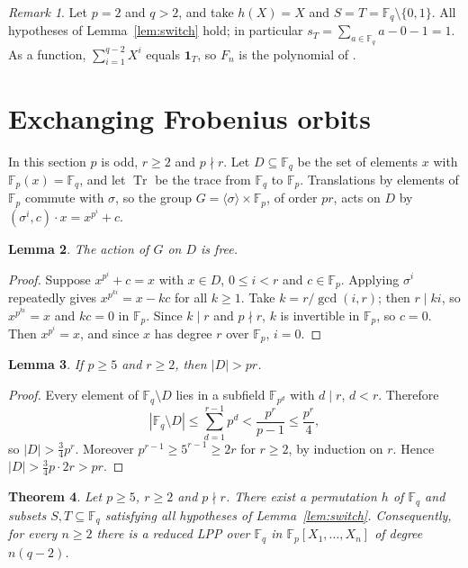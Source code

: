 \documentclass[11pt]{amsart}
\newtheorem{theorem}{Theorem}[section]
\newtheorem{lemma}[theorem]{Lemma}
\theoremstyle{definition}
\theoremstyle{remark}
\newtheorem{remark}[theorem]{Remark}
\newcommand{\F}{\mathbb{F}}
\newcommand{\Tr}{\operatorname{Tr}}
\newcommand{\one}{\mathbf{1}}
\begin{document}
\begin{remark}\label{rem:char2}
Let $p=2$ and $q>2$, and take $h(X)=X$ and $S=T=\F_q\setminus\{0,1\}$. All hypotheses of Lemma~\ref{lem:switch} hold; in particular $s_T=\sum_{a\in\F_q}a-0-1=1$. As a function, $\sum_{i=1}^{q-2}X^i$ equals $\one_T$, so $F_n$ is the polynomial of \cite[Theorem~4]{GU25a}.
\end{remark}

\section{Exchanging Frobenius orbits}\label{sec:exchange}

In this section $p$ is odd, $r\ge2$ and $p\nmid r$. Let $D\subseteq\F_q$ be the set of elements $x$ with $\F_p(x)=\F_q$, and let $\Tr$ be the trace from $\F_q$ to $\F_p$. Translations by elements of $\F_p$ commute with $\sigma$, so the group $G=\langle\sigma\rangle\times\F_p$, of order $pr$, acts on $D$ by $(\sigma^i,c)\cdot x=x^{p^i}+c$.

\begin{lemma}\label{lem:free}
The action of $G$ on $D$ is free.
\end{lemma}

\begin{proof}
Suppose $x^{p^i}+c=x$ with $x\in D$, $0\le i<r$ and $c\in\F_p$. Applying $\sigma^i$ repeatedly gives $x^{p^{ki}}=x-kc$ for all $k\ge1$. Take $k=r/\gcd(i,r)$; then $r\mid ki$, so $x^{p^{ki}}=x$ and $kc=0$ in $\F_p$. Since $k\mid r$ and $p\nmid r$, $k$ is invertible in $\F_p$, so $c=0$. Then $x^{p^i}=x$, and since $x$ has degree $r$ over $\F_p$, $i=0$.
\end{proof}

\begin{lemma}\label{lem:count}
If $p\ge5$ and $r\ge2$, then $|D|>pr$.
\end{lemma}

\begin{proof}
Every element of $\F_q\setminus D$ lies in a subfield $\F_{p^d}$ with $d\mid r$, $d<r$. Therefore
\[
|\F_q\setminus D|\le\sum_{d=1}^{r-1}p^d<\frac{p^r}{p-1}\le\frac{p^r}{4},
\]
so $|D|>\tfrac34p^r$. Moreover $p^{r-1}\ge5^{r-1}\ge2r$ for $r\ge2$, by induction on $r$. Hence $|D|>\tfrac34p\cdot2r>pr$.
\end{proof}

\begin{theorem}\label{thm:exchange}
Let $p\ge5$, $r\ge2$ and $p\nmid r$. There exist a permutation $h$ of $\F_q$ and subsets $S,T\subseteq\F_q$ satisfying all hypotheses of Lemma~\ref{lem:switch}. Consequently, for every $n\ge2$ there is a reduced LPP over $\F_q$ in $\F_p[X_1,\dots,X_n]$ of degree $n(q-2)$.
\end{theorem}
\end{document}
